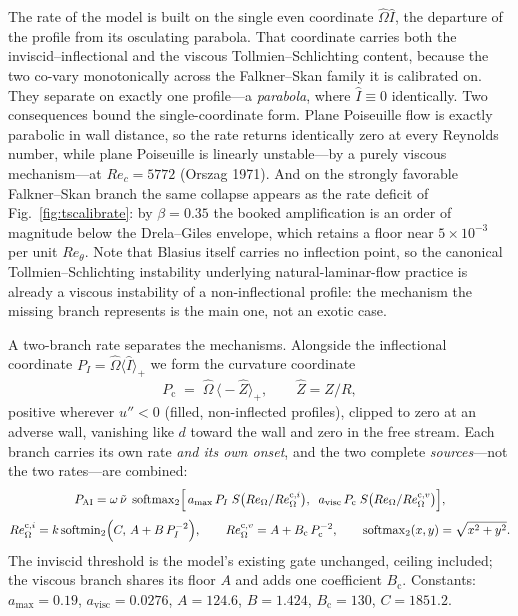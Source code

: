 
The rate of the model is built on the single even coordinate
$\hat\Omega\hat I$, the departure of the profile from its osculating
parabola. That coordinate carries both the inviscid--inflectional and the
viscous Tollmien--Schlichting content, because the two co-vary
monotonically across the Falkner--Skan family it is calibrated on. They
separate on exactly one profile---a \emph{parabola}, where $\hat I\equiv0$
identically. Two consequences bound the single-coordinate form. Plane
Poiseuille flow is exactly parabolic in wall distance, so the rate returns
identically zero at every Reynolds number, while plane Poiseuille is
linearly unstable---by a purely viscous mechanism---at $Re_c=5772$ (Orszag 1971). And on the strongly favorable Falkner--Skan branch the
same collapse appears as the rate deficit of
Fig.~\ref{fig:tscalibrate}: by $\beta\!=\!0.35$ the booked amplification is
an order of magnitude below the Drela--Giles envelope, which retains a floor
near $5\times10^{-3}$ per unit $Re_\theta$. Note that Blasius itself carries
no inflection point, so the canonical Tollmien--Schlichting instability
underlying natural-laminar-flow practice is already a viscous instability of
a non-inflectional profile: the mechanism the missing branch represents is
the main one, not an exotic case.

A two-branch rate separates the mechanisms. Alongside the inflectional
coordinate $P_I=\hat\Omega\langle\hat I\rangle_+$ we form the curvature
coordinate
\begin{equation}
  P_{\mathrm{c}} \;=\; \hat\Omega\,\big\langle -\hat Z\big\rangle_+,
  \qquad \hat Z = Z/R,
  \label{eq:ts_pcurv}
\end{equation}
positive wherever $u''<0$ (filled, non-inflected profiles), clipped to zero
at an adverse wall, vanishing like $d$ toward the wall and zero in the free
stream. Each branch carries its own rate \emph{and its own onset}, and the
two complete \emph{sources}---not the two rates---are combined:
\begin{gather}
  P_{\mathrm{AI}} = \omega\,\tilde\nu\;
  \operatorname{softmax}_2\!\Big[\,
     a_{\max}\,P_I\;S\big(Re_\Omega/Re_\Omega^{\mathrm c,i}\big),\;\;
     a_{\mathrm{visc}}\,P_{\mathrm{c}}\;S\big(Re_\Omega/Re_\Omega^{\mathrm c,v}\big)
  \Big],
  \label{eq:ts_twosource}\\[3pt]
  Re_\Omega^{\mathrm c,i} = k\operatorname{softmin}_2\!\Big(C,\,A+B\,P_I^{-2}\Big),
  \qquad
  Re_\Omega^{\mathrm c,v} = A + B_{\mathrm c}\,P_{\mathrm{c}}^{-2},
  \qquad
  \operatorname{softmax}_2(x,y)=\sqrt{x^2+y^2}.
  \notag
\end{gather}
The inviscid threshold is the model's existing gate unchanged, ceiling
included; the viscous branch shares its floor $A$ and adds one coefficient
$B_{\mathrm c}$. Constants:
$a_{\max}\!=\!0.19$, $a_{\mathrm{visc}}\!=\!0.0276$,
$A\!=\!124.6$, $B\!=\!1.424$, $B_{\mathrm c}\!=\!130$, $C\!=\!1851.2$.

